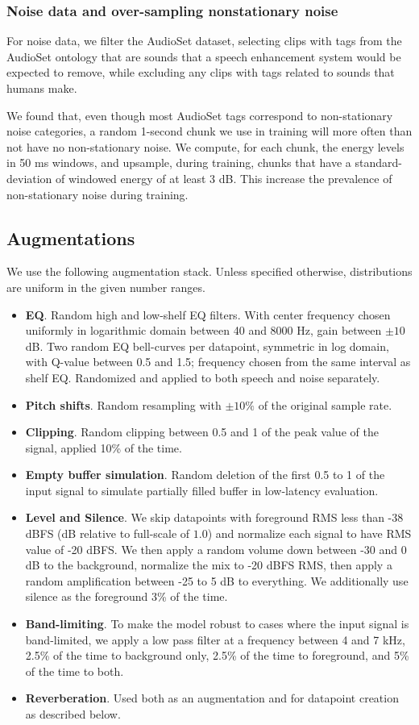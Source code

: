 \documentclass[english]{article}
\begin{document}
\subsubsection{Noise data and over-sampling nonstationary noise} For noise data, we filter the AudioSet dataset, selecting clips with tags from the AudioSet ontology that are sounds that a speech enhancement system would be expected to remove, while excluding any clips with tags related to sounds that humans make. 

We found that, even though most AudioSet tags correspond to non-stationary noise categories, a random 1-second chunk we use in training will more often than not have no non-stationary noise. We compute, for each chunk, the energy levels in 50 ms windows, and upsample, during training, chunks that have a standard-deviation of windowed energy of at least 3 dB. This increase the prevalence of non-stationary noise during training. 


\subsection{Augmentations}

We use the following augmentation stack. Unless specified otherwise, distributions are uniform in the given number ranges. 
\begin{itemize}
    \item {\bf EQ}. Random high and low-shelf EQ filters. With center frequency chosen uniformly in logarithmic domain between 40 and 8000 Hz, gain between $\pm 10$ dB. Two random EQ bell-curves per datapoint, symmetric in log domain, with Q-value between 0.5 and 1.5; frequency chosen from the same interval as shelf EQ. Randomized and applied to both speech and noise separately. 
    \item {\bf Pitch shifts}. Random resampling with $\pm 10\%$ of the original sample rate.
    \item {\bf Clipping}. Random clipping between 0.5 and 1 of the peak value of the signal, applied 10\% of the time. 
    \item {\bf Empty buffer simulation}. Random deletion of the first 0.5 to 1 of the input signal to simulate partially filled buffer in low-latency evaluation. 
    \item {\bf Level and Silence}. We skip datapoints with foreground RMS less than -38 dBFS (dB relative to full-scale of $1.0$) and normalize each signal to have RMS value of -20 dBFS. We then apply a random volume down between -30 and 0 dB to the background, normalize the mix to -20 dBFS RMS, then apply a random amplification between -25 to 5 dB to everything. We additionally use silence as the foreground 3\% of the time.
    \item {\bf Band-limiting}. To make the model robust to cases where the input signal is band-limited, we apply a low pass filter at a frequency between 4 and 7 kHz, 2.5\% of the time to background only, 2.5\% of the time to foreground, and 5\% of the time to both. 
    \item {\bf Reverberation}. Used both as an augmentation and for datapoint creation as described below.  
\end{itemize}
\end{document}
